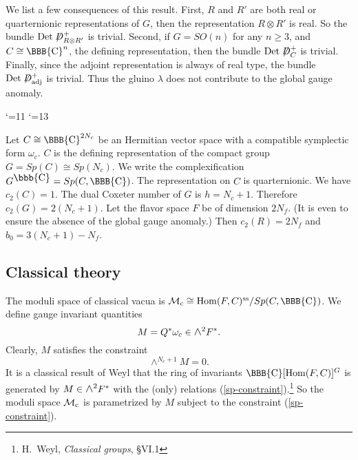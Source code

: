 \documentclass[lecture]{qft-l}
\newcommand{\lam}{\lambda}
\newcommand{\om}{\omega}
\newcommand{\co}{{\mbox{\bbb{C}}}}
\newcommand{\CO}{{\mbox{\BBB{C}}}}
\newcommand{\medwedge}{\mbox{\fontsize{12pt}{0pt}\selectfont $\wedge$}}
\newcommand{\Hom}{{\rm Hom}}
\newcommand{\be}{\begin{equation}}
\newcommand{\sss}{^{\mathrm{ss}}}
\newcommand{\Det}{\mathrm{Det}}
\newcommand{\MM}{{\mathcal M}}
\newcommand{\MC}{\MM_{{\rm c}}}
\newcommand{\dirac}{\not\kern-3pt D}
\def\Subhead#1{\subsection*{#1}}
\begin{document}
We list a few consequences of this result.
First, $R$ and $R'$ are both real or quarternionic representations of $G$,
then the representation $R\otimes R'$ is real.
So the bundle $\Det\dirac^+_{R\otimes R'}$ is trivial.
Second, if $G=SO(n)$ for any $n\ge3$, and $C\cong\CO^n$, the defining
representation, then the bundle $\Det\dirac^+_C$ is trivial.
Finally, since the adjoint representation is always of real type, 
the bundle $\Det\dirac^+_\mathrm{adj}$ is trivial.
Thus the gluino $\lam$ does not contribute to the global gauge anomaly.



\catcode`\@=11
\catcode`\@=13


Let $C\cong\CO^{2N_c}$ be an Hermitian vector space with a compatible
symplectic form $\om_c$.
$C$ is the defining representation of the compact group $G=Sp(C)\cong Sp(N_c)$.
We write the complexification $G^\co=Sp(C,\CO)$.
The representation on $C$ is quarternionic.
We have $c_2(C)=1$.
The dual Coxeter number of $G$ is $h=N_c+1$.
Therefore $c_2(G)=2(N_c+1)$.
Let the flavor space $F$ be of dimension $2N_f$.
(It is even to ensure the absence of the global gauge anomaly.)
Then $c_2(R)=2N_f$ and $b_0=3(N_c+1)-N_f$.

\Subhead{Classical theory}

The moduli space of classical vacua is $\MC\cong\Hom(F,C)\sss/Sp(C,\CO)$.
We define gauge invariant quantities
	\begin{equation}
M=Q^*\om_c\in\medwedge^2F^*.
	\end{equation}
Clearly, $M$ satisfies the constraint
	\be\label{sp-constraint}
\wedge^{N_c+1}M=0.
	\end{equation}
It is a classical result of Weyl that the ring of invariants 
$\CO[\Hom(F,C)]^G$ is generated by $M\in\medwedge^2F^*$ with the (only)
relations (\ref{sp-constraint}).\footnote{H.\ Weyl, {\it Classical groups}, 
\S VI.1}
So the moduli space $\MC$ is parametrized by $M$ subject to
the constraint (\ref{sp-constraint}).
\end{document}
